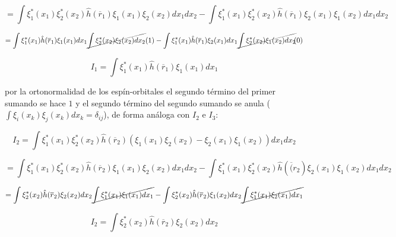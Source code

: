 \documentclass[12pt,a4paper]{article}
\begin{document}
\begin{enumerate}
\begin{enumerate}
    \begin{equation*}
        = \int  \xi_{1}^{*} (x_1) \xi_{2}^{*} (x_2)\hat{h}(\overline{r}_1)\xi_{1} (x_1) \xi_{2} (x_2) d x_1 dx_2 - \int  \xi_{1}^{*} (x_1) \xi_{2}^{*} (x_2)\hat{h}(\overline{r}_1)\xi_{2} (x_1) \xi_{1} (x_2) d x_1 dx_2
    \end{equation*}
    
    \begin{equation*}
        = \int  \xi_{1}^{*} (x_1) \hat{h}(\overline{r}_1)\xi_{1} (x_1)  d x_1 \cancel{\int \xi_{2}^{*} (x_2) \xi_{2} (x_2) dx_2}(1) - \int  \xi_{1}^{*} (x_1) \hat{h}(\overline{r}_1)\xi_{2} (x_1)  d x_1\cancel{ \int \xi_{2}^{*} (x_2) \xi_{1} (x_2) dx_2}\hspace{-0.1cm}(0)
    \end{equation*}
    
    \begin{equation}
        I_1= \int  \xi_{1}^{*} (x_1) \hat{h}(\overline{r}_1)\xi_{1} (x_1)  d x_1
    \end{equation}
    
    por la ortonormalidad de los espín-orbitales el segundo término del primer sumando se hace $1$ y el segundo término del segundo sumando se anula ($\int \xi_i(x_k) \xi_j (x_k) dx_k = \delta_{ij}$), de forma análoga con $I_2$ e $I_3$:
    
    \begin{equation*}
        I_2 = \int  \xi_{1}^{*} (x_1) \xi_{2}^{*} (x_2)\hat{h}(\overline{r}_2) (\xi_{1} (x_1) \xi_{2} (x_2) - \xi_{2} (x_1) \xi_{1} (x_2)) d x_1 dx_2
    \end{equation*}
    
    \begin{equation*}
         = \int  \xi_{1}^{*} (x_1) \xi_{2}^{*} (x_2)\hat{h}(\overline{r}_2) \xi_{1} (x_1) \xi_{2} (x_2) d x_1 dx_2 - \int  \xi_{1}^{*} (x_1) \xi_{2}^{*} (x_2)\hat{h}(\overline(r_2) \xi_{2} (x_1) \xi_{1} (x_2) d x_1 dx_2
    \end{equation*}
    
    \begin{equation*}
         = \int  \xi_{2}^{*} (x_2) \hat{h}(\overline{r}_2) \xi_{2} (x_2)  d x_2 \cancel{\int \xi_{1}^{*}(x_1) \xi_{1} (x_1)dx_1} - \int  \xi_{2}^{*} (x_2)\hat{h}(\overline{r}_2) \xi_{1} (x_2)  d x_2 \cancel{\int \xi_{1}^{*}(x_1) \xi_{2} (x_1) dx_1}
    \end{equation*}
    
    \begin{equation}
        I_2 = \int \xi_{2}^{*} (x_2) \hat{h}(\overline{r}_2) \xi_2 (x_2) dx_2
    \end{equation}
    

\end{enumerate}
\end{enumerate}
\end{document}
